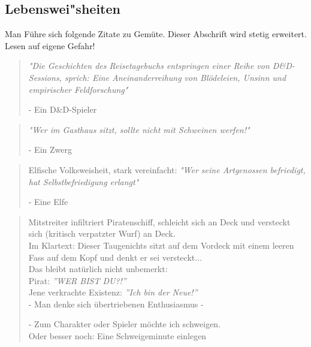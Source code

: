 \documentclass[11pt, openany]{article} %
\begin{document}
\newpage

\subsection{Lebenswei"sheiten}

Man F\"uhre sich folgende Zitate zu Gem\"ute. Dieser Abschrift wird stetig erweitert. Lesen auf eigene Gefahr!

\begin{quote}
    \textit{"Die Geschichten des Reisetagebuchs entspringen einer Reihe von D\&D-Sessions, sprich: Eine Aneinanderreihung von Bl\"odeleien, Unsinn und empirischer Feldforschung"}
    \begin{flushright}
        - Ein D\&D-Spieler
    \end{flushright}
\end{quote}

\begin{quote}
    \textit{"Wer im Gasthaus sitzt, sollte nicht mit Schweinen werfen!"}
    \begin{flushright}
        - Ein Zwerg
    \end{flushright}
\end{quote}

\begin{quote}
    Elfische Volksweisheit, stark vereinfacht: \textit{"Wer seine Artgenossen befriedigt, hat Selbstbefriedigung erlangt"}
    \begin{flushright}
        - Eine Elfe
    \end{flushright}
\end{quote}

\begin{quote}
    Mitstreiter infiltriert Piratenschiff, schleicht sich an Deck und versteckt sich (kritisch verpatzter Wurf) an Deck.\\ Im Klartext: Dieser Taugenichts sitzt auf dem Vordeck mit einem leeren Fass auf dem Kopf und denkt er sei versteckt...\\ Das bleibt nat\"urlich nicht unbemerkt:\\
    Pirat: \textit{''WER BIST DU?!''}\\
    Jene verkrachte Existenz: \textit{''Ich bin der Neue!''}\\ - Man denke sich \"ubertriebenen Enthusiasmus -
    \begin{flushright}
        - Zum Charakter oder Spieler m\"ochte ich schweigen.\\
        Oder besser noch: Eine Schweigeminute einlegen
    \end{flushright}
\end{quote}
\end{document}
